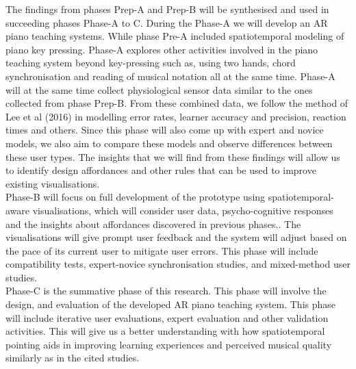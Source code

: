 \documentclass[manuscript,screen]{acmart}
\begin{document}
The findings from phases Prep-A and Prep-B will be synthesised and used in succeeding phases Phase-A to C. During the Phase-A  we will develop an AR piano teaching systems. While phase Pre-A included spatiotemporal modeling of piano key pressing. Phase-A explores other activities involved in the piano teaching system beyond key-pressing such as, using two hands, chord synchronisation and reading of musical notation all at the same time. Phase-A will at the same time collect physiological sensor data similar to the ones collected from phase Prep-B. From these combined data, we follow the method of Lee et al (2016) in modelling error rates, learner accuracy and precision, reaction times and others. Since this phase will also come up with expert and novice models, we also aim to compare these models and observe differences between these user types. The insights that we will find from these findings will allow us to identify design affordances and other rules that can be used to improve existing visualisations.\\

Phase-B will focus on full development of the prototype using spatiotemporal-aware visualisations, which will consider user data, psycho-cognitive responses and the insights about affordances discovered in previous phases.. The visualisations will give prompt user feedback and the system will adjust based on the pace of its current user to mitigate user errors. This phase will include compatibility tests, expert-novice synchronisation studies, and mixed-method user studies. \\

Phase-C is the summative phase of this research. This phase will involve the design, and evaluation of the developed AR  piano teaching system. This phase will include iterative user evaluations, expert evaluation and other validation activities. This will give us a better understanding with how spatiotemporal pointing aids in improving learning experiences and perceived musical quality similarly as in the cited studies.\\

\end{document}

